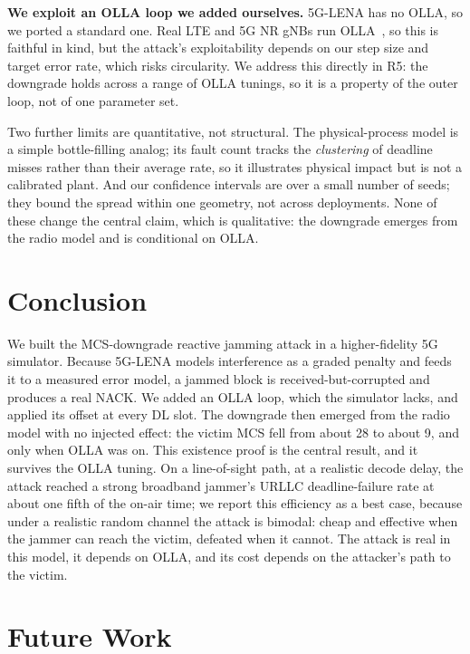 \documentclass[conference]{IEEEtran}
\begin{document}
\textbf{We exploit an OLLA loop we added ourselves.} 5G-LENA has no OLLA, so we ported a
standard one. Real LTE and 5G NR gNBs run OLLA~\cite{blanquez2016eolla,peralta2022olla},
so this is faithful in kind, but the attack's
exploitability depends on our step size and target error rate, which risks circularity.
We address this directly in R5: the downgrade holds across a range
of OLLA tunings, so it is a property of the outer loop, not of one parameter set.

Two further limits are quantitative, not structural. The physical-process model is a
simple bottle-filling analog; its fault count tracks the \emph{clustering} of deadline
misses rather than their average rate, so it illustrates physical impact but is not a
calibrated plant. And our confidence intervals are over a small number of seeds; they
bound the spread within one geometry, not across deployments. None of these change the
central claim, which is qualitative: the downgrade emerges from the radio model and is
conditional on OLLA.

\section{Conclusion}
We built the MCS-downgrade reactive jamming attack in a higher-fidelity 5G simulator.
Because 5G-LENA models interference as a graded penalty and feeds it to a measured
error model, a jammed block is received-but-corrupted and produces a real NACK. We
added an OLLA loop, which the simulator lacks, and applied its offset at every DL slot.
The downgrade then emerged from the radio model with no injected effect: the victim
MCS fell from about 28 to about 9, and only when OLLA was on. This existence proof is
the central result, and it survives the OLLA tuning. On a line-of-sight path, at a
realistic decode delay, the attack reached a strong broadband jammer's URLLC
deadline-failure rate at about one fifth of the on-air time; we report this efficiency as
a best case, because under a realistic random channel the attack is bimodal: cheap and
effective when the jammer can reach the victim, defeated when it cannot. The attack is
real in this model, it depends on OLLA, and its cost depends on the attacker's path to
the victim.

\section{Future Work}
\label{sec:future}
\end{document}
